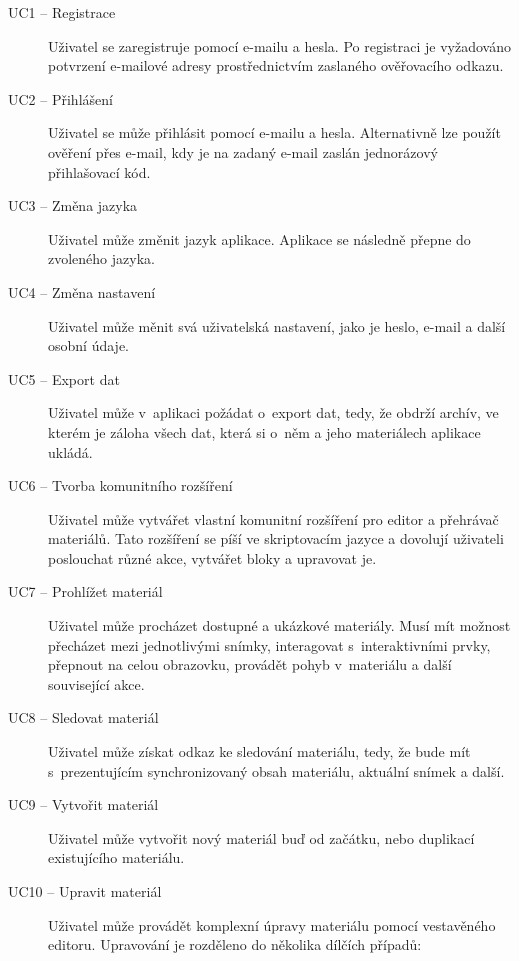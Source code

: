 \begin{description}
    \item[UC1 -- Registrace]
    Uživatel se zaregistruje pomocí e-mailu a hesla. Po registraci je vyžadováno potvrzení e-mailové adresy prostřednictvím zaslaného ověřovacího odkazu.

    \item[UC2 -- Přihlášení]
    Uživatel se může přihlásit pomocí e-mailu a hesla. Alternativně lze použít ověření přes e-mail, kdy je na zadaný e-mail zaslán jednorázový přihlašovací kód.
    
    \item[UC3 -- Změna jazyka]
    Uživatel může změnit jazyk aplikace. Aplikace se následně přepne do zvoleného jazyka. 

    \item[UC4 -- Změna nastavení]
    Uživatel může měnit svá uživatelská nastavení, jako je heslo, e-mail a další osobní údaje.
    
    \item[UC5 -- Export dat]
    Uživatel může v~aplikaci požádat o~export dat, tedy, že obdrží archív, ve kterém je záloha všech dat, která si o~něm a jeho materiálech aplikace ukládá.
    
    
    \item[UC6 -- Tvorba komunitního rozšíření]
    Uživatel může vytvářet vlastní komunitní rozšíření pro editor a přehrávač materiálů. Tato rozšíření se píší ve skriptovacím jazyce a dovolují uživateli poslouchat různé akce, vytvářet bloky a upravovat je.
    
    \item[UC7 -- Prohlížet materiál]
    Uživatel může procházet dostupné a ukázkové materiály. Musí mít možnost přecházet mezi jednotlivými snímky, interagovat s~interaktivními prvky, přepnout na celou obrazovku, provádět pohyb v~materiálu a další související akce.
    
    \item[UC8 -- Sledovat materiál]
    Uživatel může získat odkaz ke sledování materiálu, tedy, že bude mít s~prezentujícím synchronizovaný obsah materiálu, aktuální snímek a další.
    
    \item[UC9 -- Vytvořit materiál]
    Uživatel může vytvořit nový materiál buď od začátku, nebo duplikací existujícího materiálu.
    
    \item[UC10 -- Upravit materiál]
    Uživatel může provádět komplexní úpravy materiálu pomocí vestavěného editoru. Upravování je rozděleno do několika dílčích případů:
        

\end{description}
